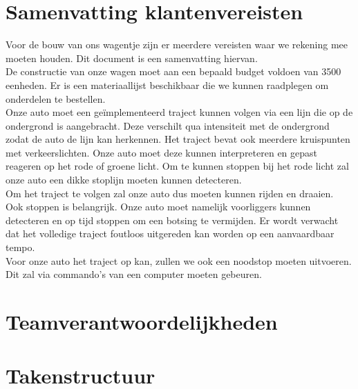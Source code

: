 \documentclass[a4paper,twoside,kulak]{kulakreport}
\begin{document}
	\section{Samenvatting klantenvereisten}
	\label{seq: klantver}
	Voor de bouw van ons wagentje zijn er meerdere vereisten waar we rekening mee moeten houden. Dit document is een samenvatting hiervan.\\
	
	De constructie van onze wagen moet aan een bepaald budget voldoen van 3500 eenheden. Er is een materiaallijst beschikbaar die we kunnen raadplegen om onderdelen te bestellen. \\
	
	Onze auto moet een geïmplementeerd traject kunnen volgen via een lijn die op de ondergrond is aangebracht. Deze verschilt qua intensiteit met de ondergrond zodat de auto de lijn kan herkennen. Het traject bevat ook meerdere kruispunten met verkeerslichten. Onze auto moet deze kunnen interpreteren en gepast reageren op het rode of groene licht. Om te kunnen stoppen bij het rode licht zal onze auto een dikke stoplijn moeten kunnen detecteren. \\
	
	Om het traject te volgen zal onze auto dus moeten kunnen rijden en draaien. Ook stoppen is belangrijk. Onze auto moet namelijk voorliggers kunnen detecteren en op tijd stoppen om een botsing te vermijden. Er wordt verwacht dat het volledige traject foutloos uitgereden kan worden op een aanvaardbaar tempo. \\
	
	Voor onze auto het traject op kan, zullen we ook een noodstop moeten uitvoeren. Dit zal via commando's van een computer moeten gebeuren.
	
	\bigskip
	
	\section{Teamverantwoordelijkheden}
	\label{seq: vera}
	
	
	\section{Takenstructuur}
	\label{sec: taken}
	
\end{document}
